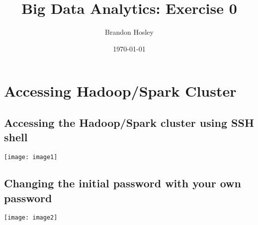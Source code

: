 \documentclass[]{article}
\title{Big Data Analytics: Exercise 0}
\author{Brandon Hosley}
\date{\today}
\begin{document}
\maketitle

\section{Accessing Hadoop/Spark Cluster}
\subsection{Accessing the Hadoop/Spark cluster using SSH shell}
	\texttt{[image: image1]}
\subsection{Changing the initial password with your own password}
	\texttt{[image: image2]}
\end{document}
